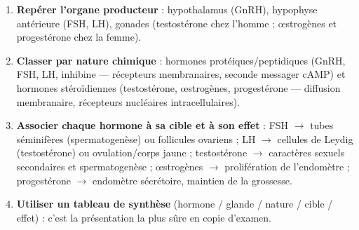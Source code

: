 \documentclass[11pt]{article}
\newcommand{\cle}[1]{{\popxbold\color{popdark}#1}}
\begin{document}
\begin{methode}
\begin{enumerate}
\item \textbf{Repérer l'organe producteur} : hypothalamus (GnRH), hypophyse antérieure (FSH, LH), gonades (testostérone chez l'homme ; \oe{}strogènes et progestérone chez la femme).
\item \textbf{Classer par nature chimique} : hormones \cle{protéiques/peptidiques} (GnRH, FSH, LH, inhibine — récepteurs membranaires, seconde messager cAMP) et hormones \cle{stéroïdiennes} (testostérone, \oe{}strogènes, progestérone — diffusion membranaire, récepteurs nucléaires intracellulaires).
\item \textbf{Associer chaque hormone à sa cible et à son effet} : FSH $\rightarrow$ tubes séminifères (spermatogenèse) ou follicules ovariens ; LH $\rightarrow$ cellules de Leydig (testostérone) ou ovulation/corps jaune ; testostérone $\rightarrow$ caractères sexuels secondaires et spermatogenèse ; \oe{}strogènes $\rightarrow$ prolifération de l'endomètre ; progestérone $\rightarrow$ endomètre sécrétoire, maintien de la grossesse.
\item \textbf{Utiliser un tableau de synthèse} (hormone / glande / nature / cible / effet) : c'est la présentation la plus sûre en copie d'examen.
\end{enumerate}
\end{methode}
\end{document}
